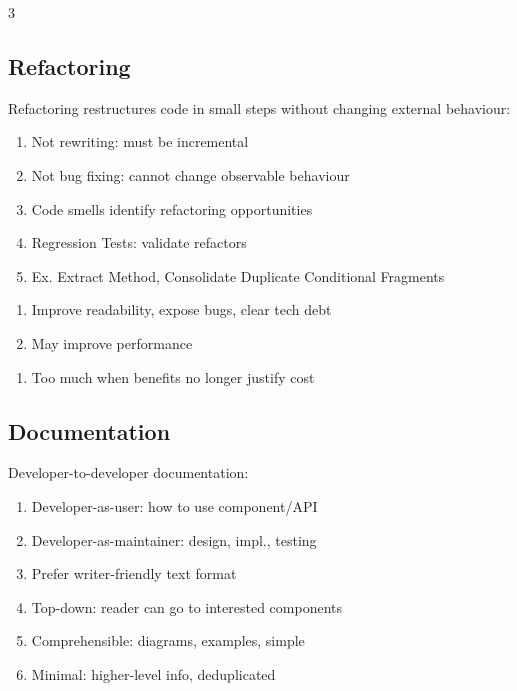 \documentclass[12pt, a4paper]{article}
\begin{document}
\begin{multicols*}{3}
\subsection{Refactoring}
Refactoring restructures code in small steps without changing external behaviour:
\begin{enumerate}[\roman*.]
  \item Not rewriting: must be incremental 
  \item Not bug fixing: cannot change observable behaviour
  \item Code smells identify refactoring opportunities
  \item Regression Tests: validate refactors
  \item Ex. Extract Method, Consolidate Duplicate Conditional Fragments
\end{enumerate}
\begin{enumerate}[$+$]\vspace{-1pt}
  \item Improve readability, expose bugs, clear tech debt 
  \item May improve performance
\end{enumerate}
\begin{enumerate}[$-$]\vspace{-1pt}
  \item Too much when benefits no longer justify cost
\end{enumerate}

\subsection{Documentation}
Developer-to-developer documentation:
\begin{enumerate}[\roman*.]
  \item Developer-as-user: how to use component/API
  \item Developer-as-maintainer: design, impl., testing
  \item Prefer writer-friendly text format 
  \item Top-down: reader can go to interested components
  \item Comprehensible: diagrams, examples, simple
  \item Minimal: higher-level info, deduplicated
\end{enumerate}


\end{multicols*}
\end{document}
